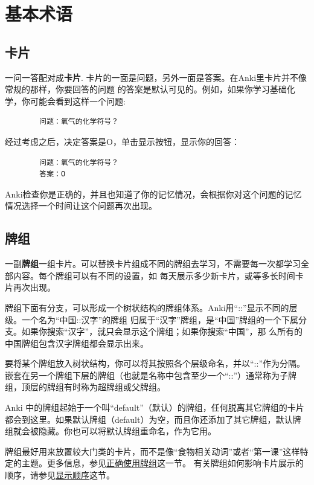 \documentclass[a4paper]{book}
\begin{document}
	\chapter{基本术语}\label{basics}
	
	\section{卡片}\label{templates}
	一问一答配对成\textbf{卡片}. 卡片的一面是问题，另外一面是答案。在Anki里卡片并不像常规的那样，你要回答的问题 的答案是默认可见的。例如，如果你学习基础化学，你可能会看到这样一个问题:
	
	\begin{shaded}\begin{verbatim}
		问题：氧气的化学符号？
		\end{verbatim}\end{shaded}
	经过考虑之后，决定答案是O，单击显示按钮，显示你的回答：
	\begin{shaded}\begin{verbatim}
		问题：氧气的化学符号？
		答案：O
		\end{verbatim}\end{shaded}
	Anki检查你是正确的，并且也知道了你的记忆情况，会根据你对这个问题的记忆情况选择一个时间让这个问题再次出现。
	
	\section{牌组}
	一副\textbf{牌组}一组卡片。可以替换卡片组成不同的牌组去学习，不需要每一次都学习全部内容。每个牌组可以有不同的设置，如 每天展示多少新卡片，或等多长时间卡片再次出现。
	
	牌组下面有分支，可以形成一个树状结构的牌组体系。Anki用“::”显示不同的层级。一个名为“中国::汉字”的牌组 归属于“汉字”牌组，是“中国”牌组的一个下属分支。如果你搜索“汉字”，就只会显示这个牌组；如果你搜索“中国”，那 么所有的中国牌组包含汉字牌组都会显示出来。
	
	要将某个牌组放入树状结构，你可以将其按照各个层级命名，并以“::”作为分隔。嵌套在另一个牌组下层的牌组（也就是名称中包含至少一个“::”）通常称为子牌组，顶层的牌组有时称为超牌组或父牌组。
	
	Anki 中的牌组起始于一个叫“default”（默认）的牌组，任何脱离其它牌组的卡片都会到这里。如果默认牌组（default）为空，而且你还添加了其它牌组，默认牌组就会被隐藏。你也可以将默认牌组重命名，作为它用。
	
	牌组最好用来放置较大门类的卡片，而不是像“食物相关动词”或者“第一课”这样特定的主题。更多信息，参见\hyperref[manydecks]{正确使用牌组}这一节。
	有关牌组如何影响卡片展示的顺序，请参见\hyperref[displayorder]{显示顺序}这节。
	
\end{document}
